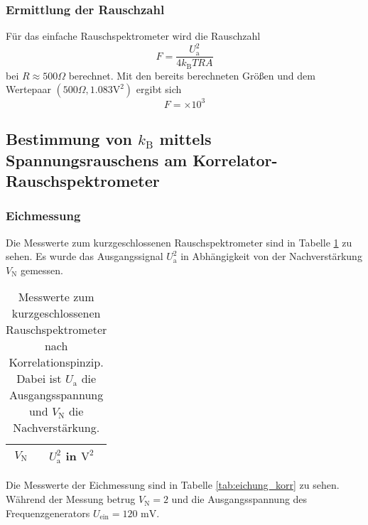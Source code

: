 			
	\subsubsection{Ermittlung der Rauschzahl}
		Für das einfache Rauschspektrometer wird die Rauschzahl 
		\begin{equation}
			F = \frac{U_\text{a}^2}{4 k_\text{B}T R A}
		\end{equation}
		bei $R\approx 500\Omega$ berechnet. Mit den bereits berechneten Größen und 
		dem Wertepaar $(500\Omega,1.083 \text{V}^2)$ ergibt sich 
		\begin{equation}
			F =  \times 10^{3}
		\end{equation}
		
		
		
		
		
		
\clearpage		
\subsection{Bestimmung von $k_\text{B}$ mittels Spannungsrauschens am 
			Korrelator-Rauschspektrometer}
			
		\subsubsection{Eichmessung}
	
		Die Messwerte zum kurzgeschlossenen Rauschspektrometer sind 
		in Tabelle \ref{tab:eichung_eigenrauschen_korr} zu sehen. 
		Es wurde das Ausgangssignal $U^2_\text{a}$ in Abhängigkeit von 
		der Nachverstärkung $V_\text{N}$ gemessen.
		
		\begin{table}[h]
		\centering
			\begin{tabular}{cc}
				\toprule \midrule
				$V_\text{N}$ & $U^2_\text{a}$ in $\text{V}^2$
				\\
				\midrule
				
				\midrule \bottomrule
			\end{tabular}
			\caption{Messwerte zum kurzgeschlossenen  
			Rauschspektrometer nach Korrelationspinzip. Dabei ist $U_\text{a}$ die 
			Ausgangsspannung und $V_\text{N}$ die Nachverstärkung.}
			\label{tab:eichung_eigenrauschen_korr}
		\end{table}
		
		Die Messwerte der Eichmessung sind in Tabelle 
		\ref{tab:eichung_korr} zu sehen. Während der Messung 
		betrug $V_\text{N}=2$ und die Ausgangsspannung des 
		Frequenzgenerators $U_\text{ein} = 120 \text{ mV}$.
		
